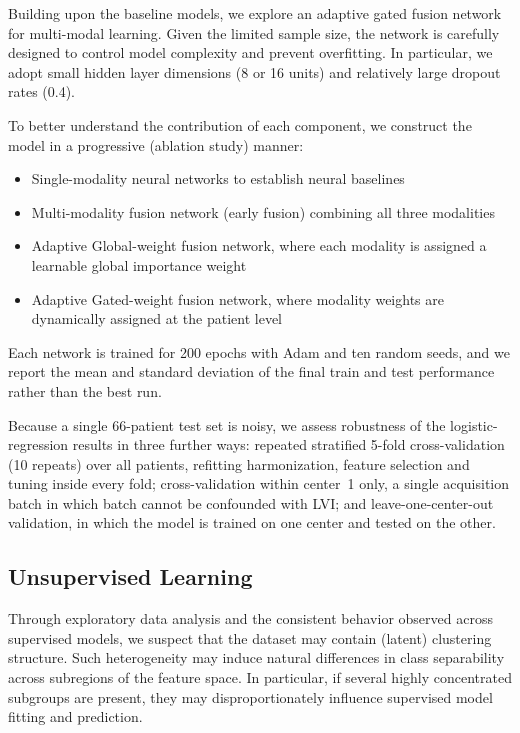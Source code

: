 \documentclass[conference]{IEEEtran}
\begin{document}
Building upon the baseline models, we explore an adaptive gated fusion network for multi-modal learning. Given the limited sample size, the network is carefully designed to control model complexity and prevent overfitting. In particular, we adopt small hidden layer dimensions (8 or 16 units) and relatively large dropout rates (0.4).

To better understand the contribution of each component, we construct the model in a progressive (ablation study) manner:
\begin{itemize}
    \item Single-modality neural networks to establish neural baselines
    \item Multi-modality fusion network (early fusion) combining all three modalities
    \item Adaptive Global-weight fusion network, where each modality is assigned a learnable global importance weight
    \item Adaptive Gated-weight fusion network, where modality weights are dynamically assigned at the patient level
\end{itemize}
Each network is trained for 200 epochs with Adam and ten random seeds, and we report the mean and standard deviation of the final train and test performance rather than the best run.

Because a single 66-patient test set is noisy, we assess robustness of the logistic-regression results in three further ways: repeated stratified 5-fold cross-validation (10 repeats) over all patients, refitting harmonization, feature selection and tuning inside every fold; cross-validation within center~1 only, a single acquisition batch in which batch cannot be confounded with LVI; and leave-one-center-out validation, in which the model is trained on one center and tested on the other.

\subsection{Unsupervised Learning}
Through exploratory data analysis and the consistent behavior observed across supervised models, we suspect that the dataset may contain (latent) clustering structure. Such heterogeneity may induce natural differences in class separability across subregions of the feature space. In particular, if several highly concentrated subgroups are present, they may disproportionately influence supervised model fitting and prediction.
\end{document}
